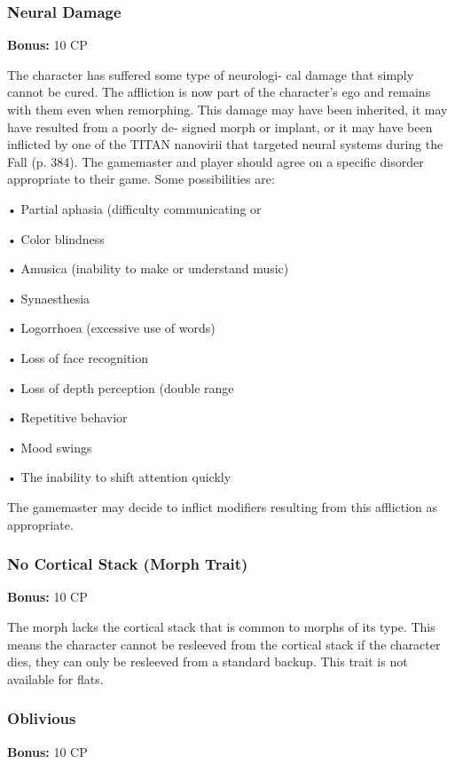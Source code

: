 \subsubsection{Neural Damage}

\textbf{Bonus:} 10 CP

The character has suffered some type of neurologi-
cal damage that simply cannot be cured. The affliction 
is now part of the character's ego and remains with 
them even when remorphing. This damage may have 
been inherited, it may have resulted from a poorly de-
signed morph or implant, or it may have been inflicted 
by one of the TITAN nanovirii that targeted neural 
systems during the Fall (p. 384). The gamemaster and 
player should agree on a specific disorder appropriate 
to their game. Some possibilities are:

•  Partial aphasia (difficulty communicating or 

•  Color blindness

•  Amusica (inability to make or understand music)

•  Synaesthesia

•  Logorrhoea (excessive use of words)

•  Loss of face recognition

•  Loss of depth perception (double range 

•  Repetitive behavior

•  Mood swings

•  The inability to shift attention quickly

The gamemaster may decide to inflict  modifiers 
resulting from this affliction as appropriate.

\subsubsection{No Cortical Stack (Morph Trait)}

\textbf{Bonus:} 10 CP

The morph lacks the cortical stack that is common 
to morphs of its type. This means the character cannot 
be resleeved from the cortical stack if the character 
dies, they can only be resleeved from a standard 
backup. This trait is not available for flats.

\subsubsection{Oblivious}

\textbf{Bonus:} 10 CP

